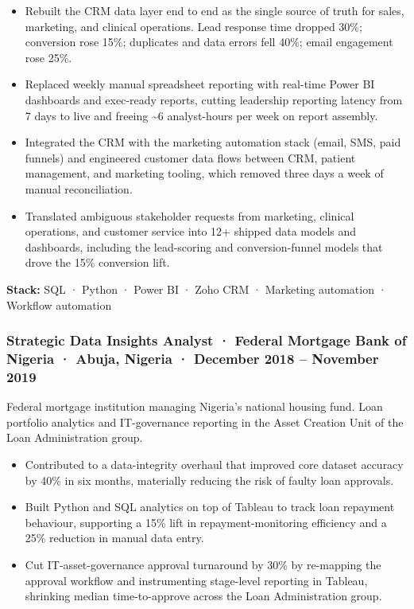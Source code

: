 \documentclass[
  10pt,
]{article}
\providecommand{\tightlist}{%
  \setlength{\itemsep}{0pt}\setlength{\parskip}{0pt}}
\begin{document}
\begin{itemize}
\tightlist
\item
  Rebuilt the CRM data layer end to end as the single source of truth
  for sales, marketing, and clinical operations. Lead response time
  dropped 30\%; conversion rose 15\%; duplicates and data errors fell
  40\%; email engagement rose 25\%.
\item
  Replaced weekly manual spreadsheet reporting with real-time Power BI
  dashboards and exec-ready reports, cutting leadership reporting
  latency from 7 days to live and freeing \textasciitilde6 analyst-hours
  per week on report assembly.
\item
  Integrated the CRM with the marketing automation stack (email, SMS,
  paid funnels) and engineered customer data flows between CRM, patient
  management, and marketing tooling, which removed three days a week of
  manual reconciliation.
\item
  Translated ambiguous stakeholder requests from marketing, clinical
  operations, and customer service into 12+ shipped data models and
  dashboards, including the lead-scoring and conversion-funnel models
  that drove the 15\% conversion lift.
\end{itemize}

\textbf{Stack:} SQL · Python · Power BI · Zoho CRM · Marketing
automation · Workflow automation

\subsubsection{Strategic Data Insights Analyst · Federal Mortgage Bank
of Nigeria · Abuja, Nigeria · December 2018 -- November
2019}\label{strategic-data-insights-analyst-federal-mortgage-bank-of-nigeria-abuja-nigeria-december-2018-november-2019}

Federal mortgage institution managing Nigeria's national housing fund.
Loan portfolio analytics and IT-governance reporting in the Asset
Creation Unit of the Loan Administration group.

\begin{itemize}
\tightlist
\item
  Contributed to a data-integrity overhaul that improved core dataset
  accuracy by 40\% in six months, materially reducing the risk of faulty
  loan approvals.
\item
  Built Python and SQL analytics on top of Tableau to track loan
  repayment behaviour, supporting a 15\% lift in repayment-monitoring
  efficiency and a 25\% reduction in manual data entry.
\item
  Cut IT-asset-governance approval turnaround by 30\% by re-mapping the
  approval workflow and instrumenting stage-level reporting in Tableau,
  shrinking median time-to-approve across the Loan Administration group.
\end{itemize}
\end{document}
